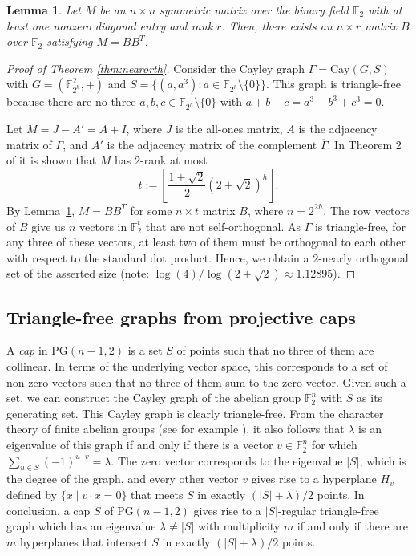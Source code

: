 \documentclass[a4paper,11pt]{amsproc}
\theoremstyle{plain}
\newtheorem{Lemma} [Theorem] {Lemma}
\theoremstyle{definition}
\newcommand{\Ff}{{\mathbb F}}
\newcommand{\<}{\langle}
\renewcommand{\>}{\rangle} %
\begin{document}
\begin{Lemma}
\label{lem:Lempel}
Let $M$ be an $n \times n$ symmetric matrix over the binary field $\mathbb{F}_2$ with at least one nonzero diagonal entry and rank $r$. Then, there exists an $n \times r$ matrix $B$ over $\mathbb{F}_2$ satisfying $M = B B^T$.
\end{Lemma}

\begin{proof}[Proof of Theorem \ref{thm:nearorth}]
  Consider the Cayley graph $\Gamma = \mathrm{Cay}(G, S)$ with $G = (\mathbb{F}_{2^h}^2, +)$ and $S = \{(a, a^3) : a \in \Ff_{2^h} \setminus \{ 0 \} \}$.
  This graph is triangle-free because there are no three $a, b, c \in \Ff_{2^h} \setminus \{0\}$ with $a + b + c = a^3 + b^3 + c^3 = 0$. 

    Let $M = J - A' = A + I$, where $J$ is the all-ones matrix, $A$ is the adjacency matrix of $\Gamma$, and $A'$ is the adjacency matrix of the complement $\overline{\Gamma}$. 
  In Theorem 2 of \cite{DHWX2023} it is shown that $M$ has $2$-rank at most
  \[
    t := \left\lfloor \frac{1+\sqrt{2}}{2} ( 2 + \sqrt{2} )^h \right\rfloor.
  \]
  By Lemma~\ref{lem:Lempel}, $M = B B^T$ for some $n \times t$ matrix $B$, where $n = 2^{2h}$. 
  The row vectors of $B$ give us $n$ vectors in $\mathbb{F}_2^t$ that are not self-orthogonal.
   As $\Gamma$ is triangle-free, for any three of these vectors, at least two of them must be orthogonal to each other with respect to the standard dot product. 
  Hence, we obtain a $2$-nearly orthogonal set of the asserted size (note: $\log(4)/\log(2+\sqrt{2})\approx 1.12895$).
\end{proof}



\subsection{Triangle-free graphs from projective caps}
\label{section:cap}
A \emph{cap} in $\mathrm{PG}(n - 1, 2)$ is a set $S$ of points such that no three of them are collinear. 
In terms of the underlying vector space, this corresponds to a set of non-zero vectors such that no three of them sum to the zero vector. 
Given such a set, we can construct the Cayley graph of the abelian group $\mathbb{F}_2^n$ with $S$ as its generating set. 
This Cayley graph is clearly triangle-free.
From the character theory of finite abelian groups (see for example \cite[Chapter 11]{GodsilMeagher}), it also follows that $\lambda$ is an eigenvalue of this graph if and only if there is a vector $v \in \mathbb{F}_2^n$ for which $\sum_{u \in S} (-1)^{u \cdot v} = \lambda$. 
The zero vector corresponds to the eigenvalue $|S|$, which is the degree of the graph, and every other vector $v$ gives rise to a hyperplane $H_v$ defined by $\{x \mid v \cdot x = 0\}$ that meets $S$ in exactly $(|S| + \lambda)/2$ points. 
In conclusion, a cap $S$ of $\mathrm{PG}(n - 1, 2)$ gives rise to a $|S|$-regular triangle-free graph which has an eigenvalue $\lambda \neq |S|$ with multiplicity $m$ if and only if there are $m$ hyperplanes that intersect $S$ in exactly $(|S| + \lambda)/2$ points. 
\end{document}
